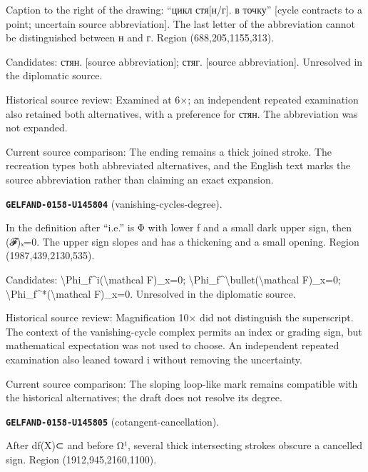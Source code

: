 Caption to the right of the drawing: “цикл стя[н/г]. в точку” [cycle contracts to a point; uncertain source abbreviation]. The last letter of the abbreviation cannot be distinguished between н and г. Region (688,205,1155,313).\par
Candidates: стян. [source abbreviation]; стяг. [source abbreviation]. Unresolved in the diplomatic source.\par
Historical source review: Examined at 6×; an independent repeated examination also retained both alternatives, with a preference for стян. The abbreviation was not expanded.\par
Current source comparison: The ending remains a thick joined stroke. The recreation types both abbreviated alternatives, and the English text marks the source abbreviation rather than claiming an exact expansion.\par\medskip
\par\noindent\leavevmode{}\label{GELFAND-0158-U145804}\label{GELFAND-P001458:vanishing-cycles-degree}\textbf{\texttt{GELFAND-0158-U145804}} (vanishing-cycles-degree).\nopagebreak[4]\par
In the definition after “i.e.” is Φ with lower f and a small dark upper sign, then (𝓕)ₓ=0. The upper sign slopes and has a thickening and a small opening. Region (1987,439,2130,535).\par
Candidates: \textbackslash{}Phi\_f\textasciicircum{}i(\textbackslash{}mathcal F)\_x=0; \textbackslash{}Phi\_f\textasciicircum{}\textbackslash{}bullet(\textbackslash{}mathcal F)\_x=0; \textbackslash{}Phi\_f\textasciicircum{}*(\textbackslash{}mathcal F)\_x=0. Unresolved in the diplomatic source.\par
Historical source review: Magnification 10× did not distinguish the superscript. The context of the vanishing-cycle complex permits an index or grading sign, but mathematical expectation was not used to choose. An independent repeated examination also leaned toward i without removing the uncertainty.\par
Current source comparison: The sloping loop-like mark remains compatible with the historical alternatives; the draft does not resolve its degree.\par\medskip
\par\noindent\leavevmode{}\label{GELFAND-0158-U145805}\label{GELFAND-P001458:cotangent-cancellation}\textbf{\texttt{GELFAND-0158-U145805}} (cotangent-cancellation).\nopagebreak[4]\par
After df(X)⊂ and before Ω¹, several thick intersecting strokes obscure a cancelled sign. Region (1912,945,2160,1100).\par

